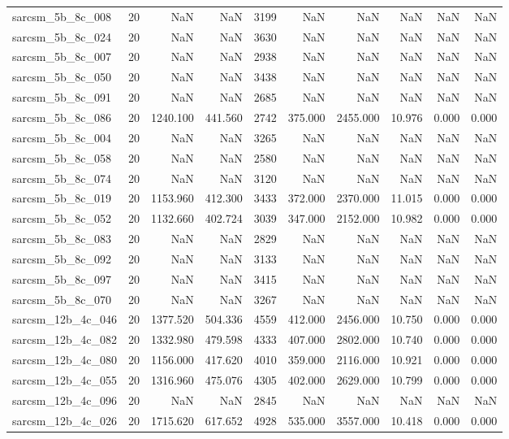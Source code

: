 \begin{tabular}{lrrrrrrrrr}
sarcsm\_5b\_8c\_008 & 20 & NaN & NaN & 3199 & NaN & NaN & NaN & NaN & NaN \\
sarcsm\_5b\_8c\_024 & 20 & NaN & NaN & 3630 & NaN & NaN & NaN & NaN & NaN \\
sarcsm\_5b\_8c\_007 & 20 & NaN & NaN & 2938 & NaN & NaN & NaN & NaN & NaN \\
sarcsm\_5b\_8c\_050 & 20 & NaN & NaN & 3438 & NaN & NaN & NaN & NaN & NaN \\
sarcsm\_5b\_8c\_091 & 20 & NaN & NaN & 2685 & NaN & NaN & NaN & NaN & NaN \\
sarcsm\_5b\_8c\_086 & 20 & 1240.100 & 441.560 & 2742 & 375.000 & 2455.000 & 10.976 & 0.000 & 0.000 \\
sarcsm\_5b\_8c\_004 & 20 & NaN & NaN & 3265 & NaN & NaN & NaN & NaN & NaN \\
sarcsm\_5b\_8c\_058 & 20 & NaN & NaN & 2580 & NaN & NaN & NaN & NaN & NaN \\
sarcsm\_5b\_8c\_074 & 20 & NaN & NaN & 3120 & NaN & NaN & NaN & NaN & NaN \\
sarcsm\_5b\_8c\_019 & 20 & 1153.960 & 412.300 & 3433 & 372.000 & 2370.000 & 11.015 & 0.000 & 0.000 \\
sarcsm\_5b\_8c\_052 & 20 & 1132.660 & 402.724 & 3039 & 347.000 & 2152.000 & 10.982 & 0.000 & 0.000 \\
sarcsm\_5b\_8c\_083 & 20 & NaN & NaN & 2829 & NaN & NaN & NaN & NaN & NaN \\
sarcsm\_5b\_8c\_092 & 20 & NaN & NaN & 3133 & NaN & NaN & NaN & NaN & NaN \\
sarcsm\_5b\_8c\_097 & 20 & NaN & NaN & 3415 & NaN & NaN & NaN & NaN & NaN \\
sarcsm\_5b\_8c\_070 & 20 & NaN & NaN & 3267 & NaN & NaN & NaN & NaN & NaN \\
sarcsm\_12b\_4c\_046 & 20 & 1377.520 & 504.336 & 4559 & 412.000 & 2456.000 & 10.750 & 0.000 & 0.000 \\
sarcsm\_12b\_4c\_082 & 20 & 1332.980 & 479.598 & 4333 & 407.000 & 2802.000 & 10.740 & 0.000 & 0.000 \\
sarcsm\_12b\_4c\_080 & 20 & 1156.000 & 417.620 & 4010 & 359.000 & 2116.000 & 10.921 & 0.000 & 0.000 \\
sarcsm\_12b\_4c\_055 & 20 & 1316.960 & 475.076 & 4305 & 402.000 & 2629.000 & 10.799 & 0.000 & 0.000 \\
sarcsm\_12b\_4c\_096 & 20 & NaN & NaN & 2845 & NaN & NaN & NaN & NaN & NaN \\
sarcsm\_12b\_4c\_026 & 20 & 1715.620 & 617.652 & 4928 & 535.000 & 3557.000 & 10.418 & 0.000 & 0.000 \\

\end{tabular}
